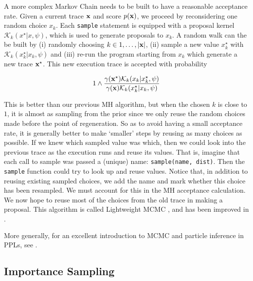 
A more complex Markov Chain needs to be built to have a reasonable acceptance rate.
Given a current trace $\boldsymbol{\mathbf{x}}$ and score $p(\boldsymbol{\mathbf{x}})$, we proceed by reconsidering one random choice $x_k$.
Each \texttt{sample} statement is equipped with a proposal kernel $\mathcal{K}_k(x^\star|x, \psi)$, which is used to generate proposals to $x_k$. A random walk can the be built by (i) randomly choosing $k \in {1,\dots,|\ensuremath{\boldsymbol{\mathbf{x}}}|}$, (ii) sample a new value $x_k^\star$ with $\mathcal{K}_k(x_k^\star|x_k, \psi)$ and (iii) re-run the program starting from $x_k$ which generate a new trace $\boldsymbol{\mathbf{x}}^\star$. This new execution trace is accepted with probability

$$ 1 \wedge \frac{\gamma(\boldsymbol{\mathbf{x}}^\star) \mathcal{K}_k(x_k|x_k^\star, \psi)}{\gamma(\boldsymbol{\mathbf{x}}) \mathcal{K}_k(x_k^\star|x_k, \psi)} $$

This is better than our previous \gls{MH} algorithm, but when the chosen $k$ is close to $1$, it is almost as sampling from the prior since we only reuse the random choices made before the point of regeneration. So as to avoid having a small acceptance rate, it is generally better to make ‘smaller’ steps by reusing as many choices as possible. If we knew which sampled value was which, then we could look into the previous trace as the execution runs and reuse its values. That is, imagine that each call to sample was passed a (unique) name: \texttt{sample(name, dist)}. Then the \texttt{sample} function could try to look up and reuse values.
Notice that, in addition to reusing existing sampled choices, we add the name and mark whether this choice has been resampled. We must account for this in the \gls{MH} acceptance calculation.
We now hope to reuse most of the choices from the old trace in making a proposal.
This algorithm is called Lightweight \gls{MCMC} \cite{Wingate:2011ul}, and has been improved in \cite{Ritchie:2015tx}.

More generally, for an excellent introduction to \gls{MCMC} and particle inference in \glspl{PPL}, see \cite{dippl}.


\subsection{Importance Sampling} \label{IS}

